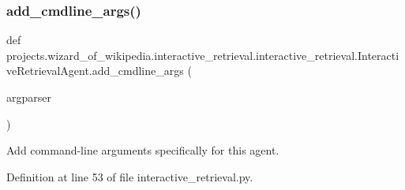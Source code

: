 \subsubsection{\texorpdfstring{add\+\_\+cmdline\+\_\+args()}{add\_cmdline\_args()}}
{\footnotesize\ttfamily def projects.\+wizard\+\_\+of\+\_\+wikipedia.\+interactive\+\_\+retrieval.\+interactive\+\_\+retrieval.\+Interactive\+Retrieval\+Agent.\+add\+\_\+cmdline\+\_\+args (\begin{DoxyParamCaption}\item[{}]{argparser }\end{DoxyParamCaption})\hspace{0.3cm}{\ttfamily [static]}}

\begin{DoxyVerb}Add command-line arguments specifically for this agent.
\end{DoxyVerb}
 

Definition at line 53 of file interactive\+\_\+retrieval.\+py.


